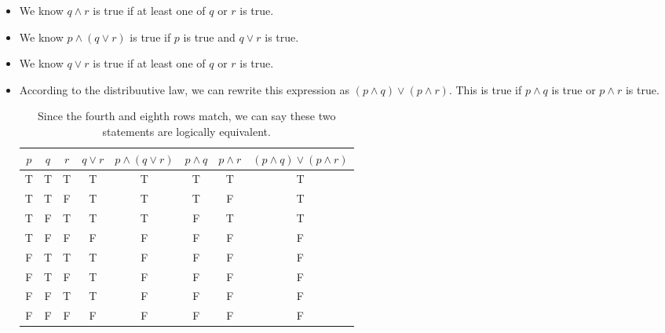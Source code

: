 \documentclass{article}
\begin{document}
\begin{enumerate}
          \begin{itemize}

              \item We know $q \wedge r$ is true if at least one of $q$ or $r$ is true.

              \item We know $p \wedge (q \vee r)$ is true if $p$ is true and $q \vee r$ is true.

              \item We know $q \vee r$ is true if at least one of $q$ or $r$ is true.

              \item According to the distribuutive law, we can rewrite this expression as $(p
                        \wedge q) \vee (p \wedge r)$. This is true if $p \wedge q$ is true or $p \wedge
                        r$ is true.
                    \begin{table}[h]
                        \centering
                        \begin{tabular}{|c|c|c||c|c|c|c|c|}
                            \hline
                            $p$ & $q$ & $r$ & $q \vee r$ & $p \wedge (q \vee r)$ & $p \wedge q$ & $p \wedge r$ & $(p \wedge q) \vee (p \wedge r)$ \\ \hline
                            T   & T   & T   & T          & T                     & T            & T            & T                                \\ \hline
                            T   & T   & F   & T          & T                     & T            & F            & T                                \\ \hline
                            T   & F   & T   & T          & T                     & F            & T            & T                                \\ \hline
                            T   & F   & F   & F          & F                     & F            & F            & F                                \\ \hline
                            F   & T   & T   & T          & F                     & F            & F            & F                                \\ \hline
                            F   & T   & F   & T          & F                     & F            & F            & F                                \\ \hline
                            F   & F   & T   & T          & F                     & F            & F            & F                                \\ \hline
                            F   & F   & F   & F          & F                     & F            & F            & F                                \\ \hline
                        \end{tabular}
                        \caption{Since the fourth and eighth rows match, we can say these two statements are logically equivalent.}
                    \end{table}


\end{itemize}
\end{enumerate}
\end{document}
